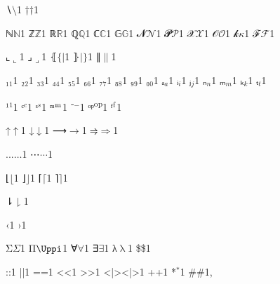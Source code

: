 {{∖}{{\color{symbolcolor}\ensuremath{\setminus}}}1
{†}{{\color{symbolcolor}\ensuremath{\dag}}}1

{ℕ}{{\ensuremath{\mathbb{N}}}}1
{ℤ}{{\ensuremath{\mathbb{Z}}}}1
{ℝ}{{\ensuremath{\mathbb{R}}}}1
{ℚ}{{\ensuremath{\mathbb{Q}}}}1
{ℂ}{{\ensuremath{\mathbb{C}}}}1
{𝔾}{{\ensuremath{\mathbb{G}}}}1
{𝓝}{{\ensuremath{\mathcal{N}}}}1
{𝓟}{{\ensuremath{\mathcal{P}}}}1
{𝒳}{{\ensuremath{\mathcal{X}}}}1
{𝒪}{{\ensuremath{\mathcal{O}}}}1
{𝓀}{{\ensuremath{\kappa}}}1
{ℱ}{{\ensuremath{\mathcal{F}}}}1

{⌞}{{\ensuremath{\llcorner}}}1
{⌟}{{\ensuremath{\lrcorner}}}1
{⦃}{{\ensuremath{\{\!|}}}1
{⦄}{{\ensuremath{|\!\}}}}1
{∥}{{\ensuremath{\|}}}1

{₁}{{\ensuremath{_1}}}1
{₂}{{\ensuremath{_2}}}1
{₃}{{\ensuremath{_3}}}1
{₄}{{\ensuremath{_4}}}1
{₅}{{\ensuremath{_5}}}1
{₆}{{\ensuremath{_6}}}1
{₇}{{\ensuremath{_7}}}1
{₈}{{\ensuremath{_8}}}1
{₉}{{\ensuremath{_9}}}1
{₀}{{\ensuremath{_0}}}1
{ₐ}{{\ensuremath{_a}}}1
{ᵢ}{{\ensuremath{_i}}}1
{ⱼ}{{\ensuremath{_j}}}1
{ₙ}{{\ensuremath{_n}}}1
{ₘ}{{\ensuremath{_m}}}1
{ₖ}{{\ensuremath{_k}}}1
{ₜ}{{\ensuremath{_t}}}1

{¹}{{\ensuremath{^1}}}1
{ᶜ}{{\color{symbolcolor}\ensuremath{^c}}}1
{ˢ}{{\color{symbolcolor}\ensuremath{^s}}}1
{ᵐ}{{\color{symbolcolor}\ensuremath{\textsuperscript{m}}}}1
{⁻}{{\ensuremath{^{-}}}}1
{ᵒᵖ}{{\color{symbolcolor}\textsuperscript{op}}}1
{ᶠ}{{\color{symbolcolor}\ensuremath{\textsuperscript{f}}}}1

{↑}{{\color{symbolcolor}\ensuremath{\uparrow}}}1
{↓}{{\color{symbolcolor}\ensuremath{\downarrow}}}1
{⟶}{{\color{symbolcolor}\ensuremath{\longrightarrow}}}1
{⥤}{{\color{symbolcolor}\ensuremath{\Rightarrow}}}1

{...}{{\ensuremath{\ldots}}}1
{⋯}{{\color{symbolcolor}\ensuremath{\cdots}}}1

{⌊}{{\ensuremath{\lfloor}}}1
{⌋}{{\ensuremath{\rfloor}}}1
{⌈}{{\ensuremath{\lceil}}}1
{⌉}{{\ensuremath{\rceil}}}1

{⇂}{{\ensuremath{\downharpoonright}}}1

{‹}{{\guilsinglleft}}1
{›}{{\guilsinglright}}1

{Σ}{{\color{symbolcolor}\ensuremath{\Sigma}}}1
{Π}{{\color{symbolcolor}\ensuremath{\Uppi}}}1 %
{∀}{{\color{symbolcolor}\ensuremath{\forall}}}1
{∃}{{\color{symbolcolor}\ensuremath{\exists}}}1
{λ}{{\color{symbolcolor}\ensuremath{\uplambda}}}1
{\$}{{\color{symbolcolor}\$}}1

{:}{{\color{symbolcolor}:}}1
{|}{{\color{symbolcolor}|}}1
{=}{{\color{symbolcolor}=}}1
{<}{{\color{symbolcolor}<}}1
{>}{{\color{symbolcolor}>}}1
{<|>}{{\color{symbolcolor}<|>}}1
{+}{{\color{symbolcolor}+}}1
{*}{{\color{symbolcolor}\ensuremath{{}^{*}}}}1
{\#}{{\color{keywordcolor}\#}}1, %

}
